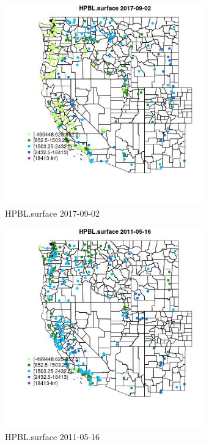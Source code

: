 \begin{figure} 
\centering  
\includegraphics[width=0.77\textwidth]{Code_Outputs/Report_ML_input_PM25_Step4_part_e_de_duplicated_aves_compiled_2019-05-20wNAs_MapObsHPBLsurface2017-09-02.jpg} 
\caption{\label{fig:Report_ML_input_PM25_Step4_part_e_de_duplicated_aves_compiled_2019-05-20wNAsMapObsHPBLsurface2017-09-02}HPBL.surface 2017-09-02} 
\end{figure} 
 

\begin{figure} 
\centering  
\includegraphics[width=0.77\textwidth]{Code_Outputs/Report_ML_input_PM25_Step4_part_e_de_duplicated_aves_compiled_2019-05-20wNAs_MapObsHPBLsurface2011-05-16.jpg} 
\caption{\label{fig:Report_ML_input_PM25_Step4_part_e_de_duplicated_aves_compiled_2019-05-20wNAsMapObsHPBLsurface2011-05-16}HPBL.surface 2011-05-16} 
\end{figure} 
 

